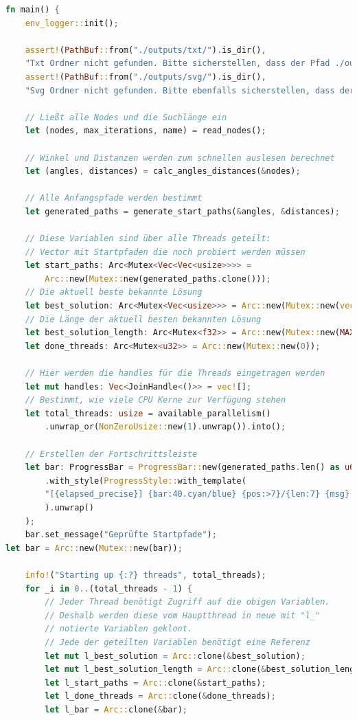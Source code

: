 \documentclass[a4paper,10pt,ngerman]{scrartcl}
\begin{document}
\begin{lstlisting}[language=Rust]
fn main() {
    env_logger::init();

    assert!(PathBuf::from("./outputs/txt/").is_dir(), 
    "Txt Ordner nicht gefunden. Bitte sicherstellen, dass der Pfad ./outputs/txt/ valide ist");
    assert!(PathBuf::from("./outputs/svg/").is_dir(), 
    "Svg Ordner nicht gefunden. Bitte ebenfalls sicherstellen, dass der Pfad ./outputs/svg/ valide ist");

    // Ließt alle Nodes und die Suchlänge ein
    let (nodes, max_iterations, name) = read_nodes();

    // Winkel und Distanzen werden zum schnellen auslesen berechnet
    let (angles, distances) = calc_angles_distances(&nodes);

    // Alle Anfangspfade werden bestimmt
    let generated_paths = generate_start_paths(&angles, &distances);

    // Diese Variablen sind über alle Threads geteilt:
    // Vector mit Startpfaden die noch probiert werden müssen
    let start_paths: Arc<Mutex<Vec<Vec<usize>>>> = 
    	Arc::new(Mutex::new(generated_paths.clone()));
    // Die aktuell beste bekannte Lösung
    let best_solution: Arc<Mutex<Vec<usize>>> = Arc::new(Mutex::new(vec![]));
    // Die Länge der aktuell besten bekannten Lösung
    let best_solution_length: Arc<Mutex<f32>> = Arc::new(Mutex::new(MAX));
    let done_threads: Arc<Mutex<u32>> = Arc::new(Mutex::new(0));

    // Hier werden die handles für die Threads eingetragen werden
    let mut handles: Vec<JoinHandle<()>> = vec![];
    // Bestimmt, wie viele CPU Kerne zur Verfügung stehen
    let total_threads: usize = available_parallelism()
        .unwrap_or(NonZeroUsize::new(1).unwrap()).into();

    // Erstellen der Fortschrittsleiste
    let bar: ProgressBar = ProgressBar::new(generated_paths.len() as u64)
        .with_style(ProgressStyle::with_template(
        "[{elapsed_precise}] {bar:40.cyan/blue} {pos:>7}/{len:7} {msg} (eta: {eta})"
        ).unwrap()
    );
    bar.set_message("Geprüfte Startpfade");
let bar = Arc::new(Mutex::new(bar));

    info!("Starting up {:?} threads", total_threads);
    for _i in 0..(total_threads - 1) {
        // Jeder Thread benötigt Zugriff auf die obigen Variablen.
        // Deshalb werden diese vom Hauptthread in neue mit "l_" 
        // notierte Variablen geklont. 
        // Jede der geteilten Variablen benötigt eine Referenz
        let mut l_best_solution = Arc::clone(&best_solution);
        let mut l_best_solution_length = Arc::clone(&best_solution_length);
        let l_start_paths = Arc::clone(&start_paths);
        let l_done_threads = Arc::clone(&done_threads);
        let l_bar = Arc::clone(&bar);


\end{lstlisting}
\end{document}
